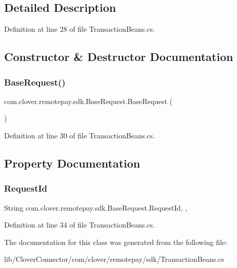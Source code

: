 \subsection{Detailed Description}




Definition at line 28 of file Transaction\+Beans.\+cs.



\subsection{Constructor \& Destructor Documentation}
\mbox{\label{classcom_1_1clover_1_1remotepay_1_1sdk_1_1_base_request_aa2ee7370085970c9a45e7038dab6b5c7}} 
\subsubsection{\texorpdfstring{Base\+Request()}{BaseRequest()}}
{\footnotesize\ttfamily com.\+clover.\+remotepay.\+sdk.\+Base\+Request.\+Base\+Request (\begin{DoxyParamCaption}{ }\end{DoxyParamCaption})\hspace{0.3cm}{\ttfamily [protected]}}



Definition at line 30 of file Transaction\+Beans.\+cs.



\subsection{Property Documentation}
\mbox{\label{classcom_1_1clover_1_1remotepay_1_1sdk_1_1_base_request_add83c9b598bb03c5caa8daf80b7c80a6}} 
\subsubsection{\texorpdfstring{Request\+Id}{RequestId}}
{\footnotesize\ttfamily String com.\+clover.\+remotepay.\+sdk.\+Base\+Request.\+Request\+Id\hspace{0.3cm}{\ttfamily [get]}, {\ttfamily [set]}, {\ttfamily [protected]}}



Definition at line 34 of file Transaction\+Beans.\+cs.



The documentation for this class was generated from the following file\+:\begin{DoxyCompactItemize}
\item 
lib/\+Clover\+Connector/com/clover/remotepay/sdk/Transaction\+Beans.\+cs\end{DoxyCompactItemize}
